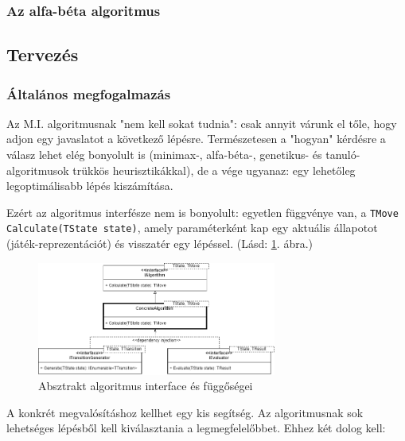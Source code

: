 \documentclass[twoside, a4paper, 12pt]{article}
\begin{document}
\subsubsection{Az alfa-béta algoritmus}
\lipsum[2]

\subsection{Tervezés}
\subsubsection{Általános megfogalmazás}
Az M.I. algoritmusnak "nem kell sokat tudnia": csak annyit várunk el tőle, hogy adjon egy javaslatot a következő lépésre. Természetesen a "hogyan" kérdésre a válasz lehet elég bonyolult is (minimax-, alfa-béta-, genetikus- és tanuló-algoritmusok trükkös heurisztikákkal), de a vége ugyanaz: egy lehetőleg legoptimálisabb lépés kiszámítása.

Ezért az algoritmus interfésze nem is bonyolult: egyetlen függvénye van, a \texttt{TMove Calculate(TState state)}, amely paraméterként kap egy aktuális állapotot (játék-reprezentációt) és visszatér egy lépéssel. (Lásd: \ref{fig:algorithmAbstractDiagram}. ábra.)

\begin{figure}[htbp]
	\centering
	\includegraphics[width=0.7\textwidth]{img/algorithmAbstractDiagram.png}
	\caption{Absztrakt algoritmus interface és függőségei}
	\label{fig:algorithmAbstractDiagram}
\end{figure}

A konkrét megvalósításhoz kellhet egy kis segítség. Az algoritmusnak sok lehetséges lépésből kell kiválasztania a legmegfelelőbbet. Ehhez két dolog kell:
\end{document}
